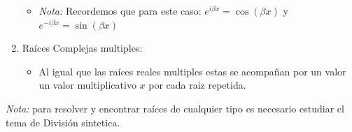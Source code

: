 \documentclass[10pt]{article}
\begin{document}
\begin{enumerate}
\begin{itemize}
    \item \textit{Nota:} Recordemos que para este caso: \(\displaystyle e^{i\beta x}=\cos\left(\beta x\right)\) y \(\displaystyle e^{-i\beta x}=\sin\left(\beta x\right)\)
  \end{itemize}
  \item Raíces Complejas multiples:
  \begin{itemize}
    \item Al igual que las raíces reales multiples estas se acompañan por un valor un valor multiplicativo $x$ por cada raiz repetida.
  \end{itemize}
\end{enumerate}
\textit{Nota:} para resolver y encontrar raíces de cualquier tipo es necesario estudiar el tema de División sintetica.
\printindex
\end{document}
